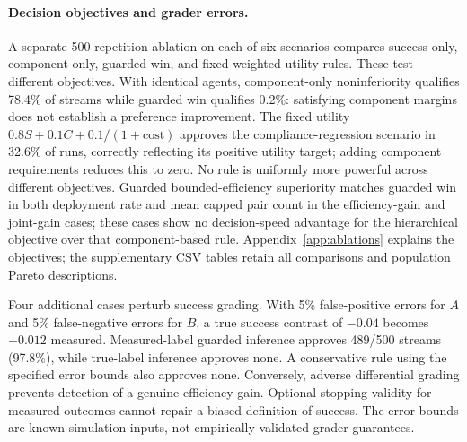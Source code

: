 \paragraph{Decision objectives and grader errors.}
A separate 500-repetition ablation on each of six scenarios compares
success-only, component-only, guarded-win, and fixed weighted-utility
rules. These test different objectives. With identical agents,
component-only noninferiority qualifies 78.4\% of streams while guarded
win qualifies 0.2\%: satisfying component margins does not establish a
preference improvement. The fixed utility $0.8S+0.1C+0.1/(1+\mathrm{cost})$
approves the compliance-regression scenario in 32.6\% of runs, correctly
reflecting its positive utility target; adding component requirements
reduces this to zero. No rule is uniformly more powerful across different
objectives. Guarded bounded-efficiency superiority matches guarded win
in both deployment rate and mean capped pair count in the efficiency-gain
and joint-gain cases; these cases show no decision-speed advantage for
the hierarchical objective over that component-based rule.
Appendix~\ref{app:ablations} explains the objectives; the supplementary
CSV tables retain all comparisons and population Pareto descriptions.

Four additional cases perturb success grading. With 5\% false-positive
errors for $A$ and 5\% false-negative errors for $B$, a true success
contrast of $-0.04$ becomes $+0.012$ measured. Measured-label guarded
inference approves 489/500 streams (97.8\%), while true-label inference
approves none. A conservative rule using the specified error bounds also
approves none. Conversely, adverse differential grading prevents detection
of a genuine efficiency gain. Optional-stopping validity for measured
outcomes cannot repair a biased definition of success. The error bounds
are known simulation inputs, not empirically validated grader guarantees.
